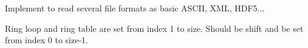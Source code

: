 
\begin{DoxyRefList}
\item[\label{todo__todo000001}%
\hypertarget{todo__todo000001}{}%
Global \hyperlink{group__matmap__group11_ga56b5e9bda4e4ad0a2c4f2f12e94d077e}{Mat\-Load} (\hyperlink{structMat}{Mat} $\ast$mat, char $\ast$filename)]Implement to read several file formats as basic A\-S\-C\-I\-I, X\-M\-L, H\-D\-F5...  
\item[\label{todo__todo000002}%
\hypertarget{todo__todo000002}{}%
Global \hyperlink{group__matmap__group22_gab4bcafb298be124aaa5bfed34348b1ea}{ring\-\_\-init} (int $\ast$indices, int count, int $\ast$$\ast$\-R, int $\ast$n\-R, int $\ast$$\ast$\-S, int $\ast$n\-S, int steps, M\-P\-I\-\_\-\-Comm comm)]Ring loop and ring table are set from index 1 to size. Should be shift and be set from index 0 to size-\/1. 
\end{DoxyRefList}